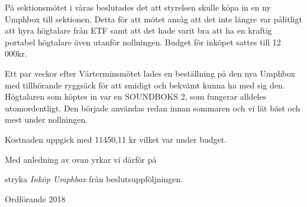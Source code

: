 \documentclass[../_main/handlingar.tex]{subfiles}
\begin{document}
På sektionsmötet i våras beslutades det att styrelsen skulle köpa in en ny Umphbox till sektionen. Detta för att mötet ansåg att det inte längre var pålitligt att hyra högtalare från ETF samt att det hade varit bra att ha en kraftig portabel högtalare även utanför nollningen. Budget för inköpet sattes till 12 000kr.

Ett par veckor efter Vårterminsmötet lades en beställning på den nya Umphbox med tillhörande ryggsäck för att smidigt och bekvämt kunna ha med sig den. Högtalaren som köptes in var en SOUNDBOKS 2, som fungerar alldeles utomordentligt. Den började användas redan innan sommaren och vi lät bäst och mest under nollningen.

Kostnaden uppgick med 11450,11 kr vilket var under budget.

Med anledning av ovan yrkar vi därför på
\begin{attsatser}
    \att stryka \emph{Inköp Umphbox} från beslutsuppföljningen.
\end{attsatser}

\begin{signatures}{1}
    \ist
	\signature{Daniel Bakic}{Ordförande 2018}
\end{signatures}
\end{document}
